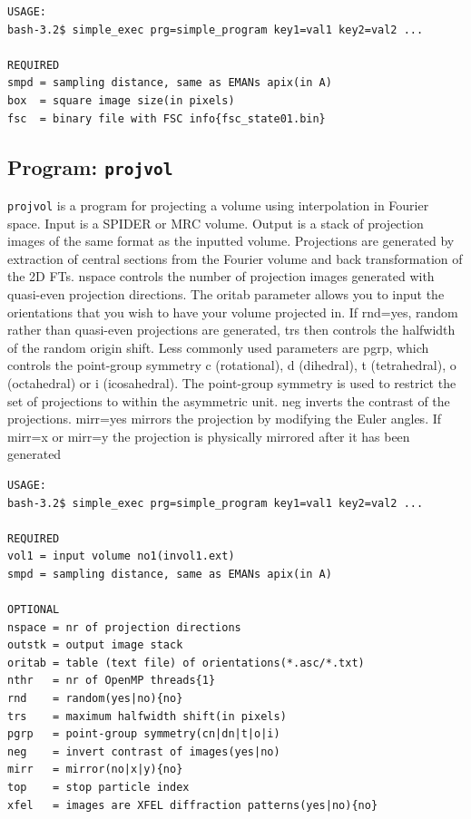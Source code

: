 \documentclass[a4paper,11pt]{article}
\newcommand{\prgname}[1]{\textcolor{NavyBlue}{\texttt{#1}}}
\begin{document}
\begin{verbatim}
USAGE:
bash-3.2$ simple_exec prg=simple_program key1=val1 key2=val2 ...

REQUIRED
smpd = sampling distance, same as EMANs apix(in A)
box  = square image size(in pixels)
fsc  = binary file with FSC info{fsc_state01.bin}
\end{verbatim}

\subsection{Program: \prgname{projvol}}
\label{projvol}
\prgname{projvol} is a program for projecting a volume using interpolation in Fourier space. Input is a SPIDER or MRC volume. Output is a stack of projection images of the same format as the inputted volume. Projections are generated by extraction of central sections from the Fourier volume and back transformation of the 2D FTs. nspace controls the number of projection images generated with quasi-even projection directions. The oritab parameter allows you to input the orientations that you wish to have your volume projected in. If rnd=yes, random rather than quasi-even projections are generated, trs then controls the halfwidth of the random origin shift. Less commonly used parameters are pgrp, which controls the point-group symmetry c (rotational), d (dihedral), t (tetrahedral), o (octahedral) or i (icosahedral). The point-group symmetry is used to restrict the set of projections to within the asymmetric unit. neg inverts the contrast of the projections. mirr=yes mirrors the projection by modifying the Euler angles. If mirr=x or mirr=y the projection is physically mirrored after it has been generated

\begin{verbatim}
USAGE:
bash-3.2$ simple_exec prg=simple_program key1=val1 key2=val2 ...

REQUIRED
vol1 = input volume no1(invol1.ext)
smpd = sampling distance, same as EMANs apix(in A)

OPTIONAL
nspace = nr of projection directions
outstk = output image stack
oritab = table (text file) of orientations(*.asc/*.txt)
nthr   = nr of OpenMP threads{1}
rnd    = random(yes|no){no}
trs    = maximum halfwidth shift(in pixels)
pgrp   = point-group symmetry(cn|dn|t|o|i)
neg    = invert contrast of images(yes|no)
mirr   = mirror(no|x|y){no}
top    = stop particle index
xfel   = images are XFEL diffraction patterns(yes|no){no}
\end{verbatim}
\end{document}
